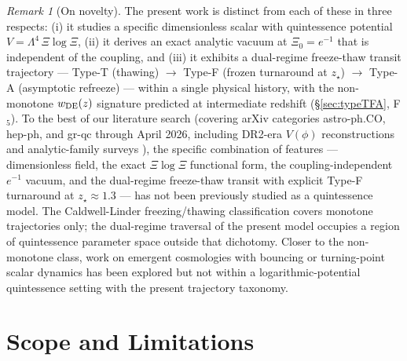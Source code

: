 \documentclass[11pt,reqno]{amsart}
\theoremstyle{plain}
\theoremstyle{definition}
\theoremstyle{remark}
\newtheorem*{remark}{Remark}
\begin{document}
\begin{remark}[On novelty]
The present work is distinct from each of these in three respects: (i)
it studies a specific dimensionless scalar with quintessence potential
$V = \Lambda^{4}\,\Xi\log\Xi$, (ii) it derives an exact analytic vacuum
at $\Xi_0 = e^{-1}$ that is independent of the coupling, and (iii) it
exhibits a dual-regime freeze-thaw transit trajectory --- Type-T
(thawing) $\to$ Type-F (frozen turnaround at $z_\star$) $\to$ Type-A
(asymptotic refreeze) --- within a single physical history, with the
non-monotone $w_{\rm DE}(z)$ signature predicted at intermediate
redshift (\S\ref{sec:typeTFA}, F$_5$). To the best of our
literature search
(covering arXiv categories astro-ph.CO, hep-ph, and gr-qc through April
2026, including DR2-era $V(\phi)$ reconstructions and analytic-family
surveys
\cite{AdamEtAl2025,Adil2026Analytic,Wang2026QReconstruction}), the
specific combination of features --- dimensionless field, the exact
$\Xi\log\Xi$ functional form, the coupling-independent $e^{-1}$ vacuum,
and the dual-regime freeze-thaw transit with explicit Type-F turnaround
at $z_\star \approx 1.3$ --- has not been previously studied as a
quintessence model. The Caldwell-Linder \cite{CaldwellLinder2005}
freezing/thawing classification covers monotone trajectories only;
the dual-regime traversal of the present model occupies a region of
quintessence parameter space outside that dichotomy. Closer to the
non-monotone class, work on emergent cosmologies with bouncing or
turning-point scalar dynamics has been explored
\cite{Bag2014NonMonotonic} but not within a logarithmic-potential
quintessence setting with the present trajectory taxonomy.
\end{remark}

\section{Scope and Limitations}\label{sec:scope}
\end{document}
